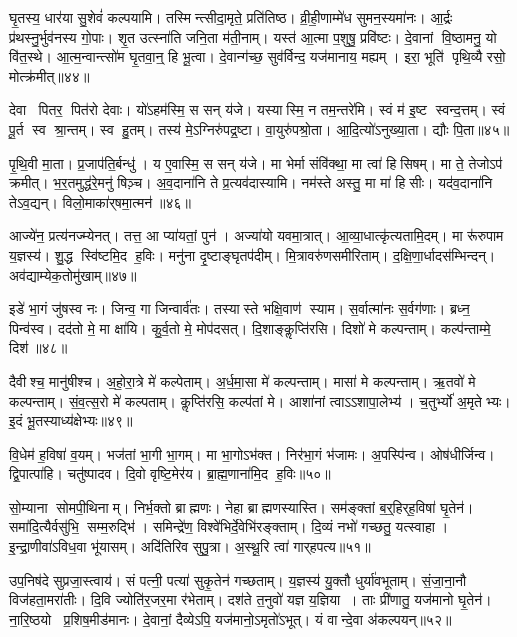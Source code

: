 घृ॒तस्य॒ धार॑या सु॒शेवं॑ कल्पयामि।
तस्मिन्त्सीदा॒मृते॒ प्रति॑तिष्ठ।
व्री॒ही॒णाम्मे॑ध सुमन॒स्यमा॑नः।
आ॒र्द्रः प्र॑थस्नु॒र्भुव॑नस्य गो॒पाः।
शृ॒त उत्स्ना॑ति जनि॒ता म॑ती॒नाम्।
यस्त॑ आ॒त्मा प॒शुषु॒ प्रवि॑ष्टः।
दे॒वानां वि॒ष्ठामनु॒ यो वि॑त॒स्थे।
आ॒त्म॒न्वान्त्सो॑म घृ॒तवा॒न्॒ हि भू॒त्वा।
दे॒वान्ग॑च्छ॒ सुव॑र्विन्द॒ यज॑मानाय॒ मह्यम्।
इरा॒ भूति॑ पृथि॒व्यै रसो॒ मोत्क्र॑मीत्॥४४॥

देवा पितर॒ पित॑रो देवाः।
यो॑ऽहम॑स्मि॒ स सन् य॑जे।
यस्यास्मि॒ न तम॒न्तरे॑मि।
स्वं म॑ इ॒ष्ट स्वन्द॒त्तम्।
स्वं पू॒र्त स्व श्रा॒न्तम्।
स्व हु॒तम्।
तस्य॑ मे॒ऽग्निरु॑पद्र॒ष्टा।
वा॒युरु॑पश्रो॒ता।
आ॒दि॒त्यो॑ऽनुख्या॒ता।
द्यौः पि॒ता॥४५॥

पृ॒थि॒वी मा॒ता।
प्र॒जाप॑ति॒र्बन्धु॑।
य ए॒वास्मि॒ स सन् य॑जे।
मा भेर्मा संवि॑क्था॒ मा त्वा॑ हिसिषम्।
मा ते॒ तेजोऽप॑ क्रमीत्।
भ॒र॒तमुद्ध॑रे॒मनु॑ षिञ़्च।
अ॒व॒दाना॑नि ते प्र॒त्यव॑दास्यामि।
नम॑स्ते अस्तु॒ मा मा॑ हिसीः।
यद॑व॒दाना॑नि तेऽव॒द्यन्।
विलो॒माका॑र्‌षमा॒त्मन॑॥४६॥

आज्ये॑न॒ प्रत्य॑नज्म्येनत्।
तत्त॒ आ प्या॑यतां॒ पुन॑।
अज्या॑यो यवमा॒त्रात्।
आ॒व्या॒धात्कृ॑त्यतामि॒दम्।
मा रू॑रुपाम य॒ज्ञस्य॑।
शु॒द्ध स्वि॑ष्टमि॒द ह॒विः।
मनु॑ना दृ॒ष्टाङ्घृतप॑दीम्।
मि॒त्रावरु॑णसमीरिताम्।
द॒क्षि॒णा॒र्धादस॑म्भिन्दन्।
अव॑द्याम्येक॒तोमु॑खाम्॥४७॥

इडे॑ भा॒गं जु॑षस्व नः।
जिन्व॒ गा जिन्वार्व॑तः।
तस्यास्ते भक्षि॒वाण॑ स्याम।
स॒र्वात्मा॑नः स॒र्वग॑णाः।
ब्रध्न॒ पिन्व॑स्व।
दद॑तो मे॒ मा क्षा॑यि।
कु॒र्व॒तो मे॒ मोप॑दसत्।
दि॒शाङ्कॢप्ति॑रसि।
दिशो॑ मे कल्पन्ताम्।
कल्प॑न्ताम्मे॒ दिश॑॥४८॥

दैवीश्च॒ मानु॑षीश्च।
अ॒हो॒रा॒त्रे मे॑ कल्पेताम्।
अ॒र्ध॒मा॒सा मे॑ कल्पन्ताम्।
मासा॑ मे कल्पन्ताम्।
ऋ॒तवो॑ मे कल्पन्ताम्।
सं॒व॒त्स॒रो मे॑ कल्पताम्।
कॢप्ति॑रसि॒ कल्प॑तां मे।
आशा॑नां त्वाऽऽशापा॒लेभ्य॑।
च॒तुर्भ्यो॑ अ॒मृतेभ्यः।
इ॒दं भू॒तस्याध्य॑क्षेभ्यः॥४९॥

वि॒धेम॑ ह॒विषा॑ व॒यम्।
भज॑तां भा॒गी भा॒गम्।
मा भा॒गोऽभ॑क्त।
निर॑भा॒गं भ॑जामः।
अ॒पस्पि॑न्व।
ओष॑धीर्जिन्व।
द्वि॒पात्पा॑हि।
चतु॑ष्पादव।
दि॒वो वृष्टि॒मेर॑य।
ब्रा॒ह्म॒णाना॑मि॒द ह॒विः॥५०॥

सो॒म्याना सोमपी॒थिनाम्।
निर्भ॒क्तो ब्राह्मणः।
नेहा ब्राह्मणस्यास्ति।
सम॑ङ्क्तां ब॒र्॒हिर्‌ह॒विषा॑ घृ॒तेन॑।
समा॑दि॒त्यैर्वसु॑भि॒ सम्म॒रुद्भि॑।
समिन्द्रे॑ण॒ विश्वे॑भिर्दे॒वेभि॑रङ्क्ताम्।
दि॒व्यं नभो॑ गच्छतु॒ यत्स्वाहा।
इ॒न्द्रा॒णीवा॑ऽविध॒वा भू॑यासम्।
अदि॑तिरिव सुपु॒त्रा।
अ॒स्थू॒रि त्वा॑ गार्‌हपत्य॥५१॥

उप॒निष॑दे सुप्रजा॒स्त्वाय॑।
सं पत्नी॒ पत्या॑ सुकृ॒तेन॑ गच्छताम्।
य॒ज्ञस्य॑ यु॒क्तौ धुर्या॑वभूताम्।
सं॒जा॒ना॒नौ विज॑हता॒मरा॑तीः।
दि॒वि ज्योति॑र॒जर॒मा र॑भेताम्।
दश॑ते त॒नुवो॑ यज्ञ य॒ज्ञिया।
ताः प्री॑णातु॒ यज॑मानो घृ॒तेन॑।
ना॒रि॒ष्ठयो प्र॒शिष॒मीड॑मानः।
दे॒वानां॒ दैव्येऽपि॒ यज॑मानो॒ऽमृतो॑ऽभूत्।
यं वान्दे॒वा अ॑कल्पयन्॥५२॥

